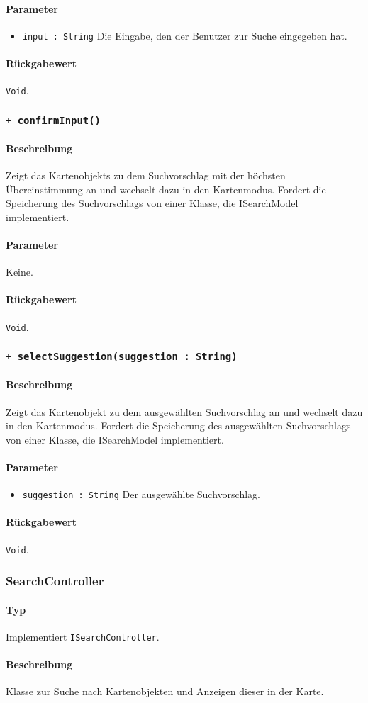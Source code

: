 \paragraph*{Parameter}
\begin{itemize}
    \item \texttt{input : String} Die Eingabe, den der Benutzer zur Suche eingegeben hat.
\end{itemize}
\paragraph*{Rückgabewert}
\texttt{Void}.

\subsubsection*{\texttt{+ confirmInput()}}%
\paragraph*{Beschreibung}
Zeigt das Kartenobjekts zu dem Suchvorschlag mit der höchsten Übereinstimmung an und wechselt dazu in den Kartenmodus.
Fordert die Speicherung des Suchvorschlags von einer Klasse, die ISearchModel implementiert.
\paragraph*{Parameter}
Keine.
\paragraph*{Rückgabewert}
\texttt{Void}.

\subsubsection*{\texttt{+ selectSuggestion(suggestion : String)}}%
\paragraph*{Beschreibung}
Zeigt das Kartenobjekt zu dem ausgewählten Suchvorschlag an und wechselt dazu in den Kartenmodus.
Fordert die Speicherung des ausgewählten Suchvorschlags von einer Klasse, die ISearchModel implementiert.
\paragraph*{Parameter}
\begin{itemize}
    \item \texttt{suggestion : String} Der ausgewählte Suchvorschlag.
\end{itemize}
\paragraph*{Rückgabewert}
\texttt{Void}.


\subsubsection{SearchController}
\paragraph*{Typ}
Implementiert \texttt{ISearchController}.
\paragraph*{Beschreibung}
Klasse zur Suche nach Kartenobjekten und Anzeigen dieser in der Karte.